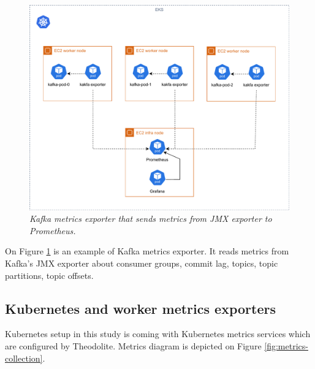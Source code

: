\begin{figure}[ht]
    \centering
    \includegraphics[width=1\textwidth]{figures/kafka-exporter}
    \caption{\textit{Kafka metrics exporter that sends metrics from JMX exporter to Prometheus.}}
    \label{fig:kafka-exporter}
\end{figure}

On Figure \ref{fig:kafka-exporter} is an example of Kafka metrics exporter.
It reads metrics from Kafka's JMX exporter about consumer groups, commit lag, topics,
topic partitions, topic offsets.

\newpage
\subsection{Kubernetes and worker metrics exporters}
Kubernetes setup in this study is coming with Kubernetes metrics services \cite{kubernetesResourceMetrics} which are
configured by Theodolite.
Metrics diagram is depicted on Figure \ref{fig:metrics-collection}.

